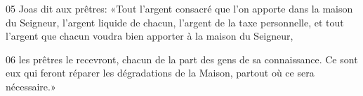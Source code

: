 

05 Joas dit aux prêtres: «Tout l’argent consacré que l’on apporte dans la maison du Seigneur, l’argent liquide de chacun, l’argent de la taxe personnelle, et tout l’argent que chacun voudra bien apporter à la maison du Seigneur,


06 les prêtres le recevront, chacun de la part des gens de sa connaissance. Ce sont eux qui feront réparer les dégradations de la Maison, partout où ce sera nécessaire.»
